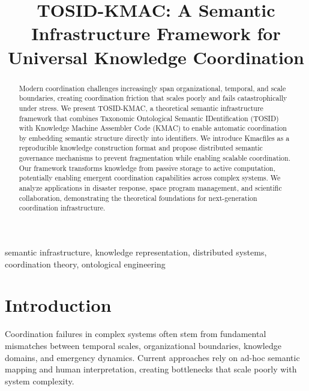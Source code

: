 \documentclass[conference]{IEEEtran}
\begin{document}
\title{TOSID-KMAC: A Semantic Infrastructure Framework for Universal Knowledge Coordination}

\author{
\and
{}
}

\maketitle

\begin{abstract}
Modern coordination challenges increasingly span organizational, temporal, and scale boundaries, creating coordination friction that scales poorly and fails catastrophically under stress. We present TOSID-KMAC, a theoretical semantic infrastructure framework that combines Taxonomic Ontological Semantic IDentification (TOSID) with Knowledge Machine Assembler Code (KMAC) to enable automatic coordination by embedding semantic structure directly into identifiers. We introduce Kmacfiles as a reproducible knowledge construction format and propose distributed semantic governance mechanisms to prevent fragmentation while enabling scalable coordination. Our framework transforms knowledge from passive storage to active computation, potentially enabling emergent coordination capabilities across complex systems. We analyze applications in disaster response, space program management, and scientific collaboration, demonstrating the theoretical foundations for next-generation coordination infrastructure.
\end{abstract}

\begin{IEEEkeywords}
semantic infrastructure, knowledge representation, distributed systems, coordination theory, ontological engineering
\end{IEEEkeywords}

\section{Introduction}

Coordination failures in complex systems often stem from fundamental mismatches between temporal scales, organizational boundaries, knowledge domains, and emergency dynamics. Current approaches rely on ad-hoc semantic mapping and human interpretation, creating bottlenecks that scale poorly with system complexity.
\end{document}
